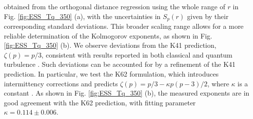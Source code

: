 \documentclass[aps,prl,twocolumn,showpacs,notitlepage,floatfix,superscriptaddress]{revtex4-1}
\begin{document}
obtained from the orthogonal distance regression 
using the whole range of $r$ in Fig. \ref{fig:ESS_Tq_350} (a), 
with the uncertainties in $S_p(r)$ given by their corresponding standard deviations. 
This broader scaling range allows for a more reliable determination of the Kolmogorov exponents, as shown in Fig. \ref{fig:ESS_Tq_350} (b). We observe deviations from the K41 prediction, $\zeta(p) = p/3$, 
consistent with results reported in both classical and quantum turbulence \cite{Benzi1993,Krstulovic2016,Zhao25}. Such deviations can be accounted for by a refinement of the K41 prediction. In particular, we test the K62 formulation, which introduces intermittency corrections and predicts $\zeta(p) = p / 3 - \kappa p (p - 3) / 2$,
where $\kappa$ is a constant \cite{Kolmogorov_1962}.
As shown in Fig. \ref{fig:ESS_Tq_350} (b), the measured exponents are in good agreement with the K62 prediction, with fitting parameter $\kappa = 0.114 \pm 0.006$. 
\end{document}
